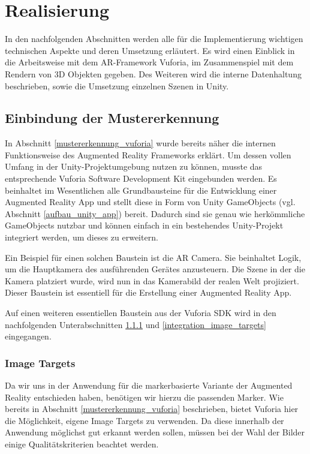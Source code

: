 \chapter{Realisierung}\label{ch:realisierung_der_anwendung}
In den nachfolgenden Abschnitten werden alle für die Implementierung wichtigen technischen Aspekte und deren Umsetzung erläutert. Es wird einen Einblick in die Arbeitsweise mit dem AR-Framework Vuforia, im Zusammenspiel mit dem Rendern von 3D Objekten gegeben. Des Weiteren wird die interne Datenhaltung beschrieben, sowie die Umsetzung einzelnen Szenen in Unity.

\section{Einbindung der Mustererkennung}\label{einbindung_mustererkennung}
In Abschnitt \ref{mustererkennung_vuforia} wurde bereits näher die internen Funktionsweise des Augmented Reality Frameworks  erklärt. 
Um dessen vollen Umfang in der Unity-Projektumgebung nutzen zu können, musste das entsprechende Vuforia Software Development Kit eingebunden werden.
Es beinhaltet im Wesentlichen alle Grundbausteine für die Entwicklung einer Augmented Reality App und stellt diese in Form von Unity GameObjects (vgl. Abschnitt \ref{aufbau_unity_app}) bereit. 
Dadurch sind sie genau wie herkömmliche GameObjects nutzbar und können einfach in ein bestehendes Unity-Projekt integriert werden, um dieses zu erweitern.

Ein Beispiel für einen solchen Baustein ist die AR Camera. 
Sie beinhaltet Logik, um die Hauptkamera des ausführenden Gerätes anzusteuern. 
Die Szene in der die Kamera platziert wurde, wird nun in das Kamerabild der realen Welt projiziert.
Dieser Baustein ist essentiell für die Erstellung einer Augmented Reality App. 

Auf einen weiteren essentiellen Baustein aus der Vuforia SDK wird in den nachfolgenden Unterabschnitten \ref{image_targets} und \ref{integration_image_targets} eingegangen. 

\subsection{Image Targets}\label{image_targets}
Da wir uns in der Anwendung für die markerbasierte Variante der Augmented Reality entschieden haben, benötigen wir hierzu die passenden Marker. 
Wie bereits in Abschnitt \ref{mustererkennung_vuforia} beschrieben, bietet Vuforia hier die Möglichkeit, eigene Image Targets zu verwenden. 
Da diese innerhalb der Anwendung möglichst gut erkannt werden sollen, müssen bei der Wahl der Bilder einige Qualitätskriterien beachtet werden.

